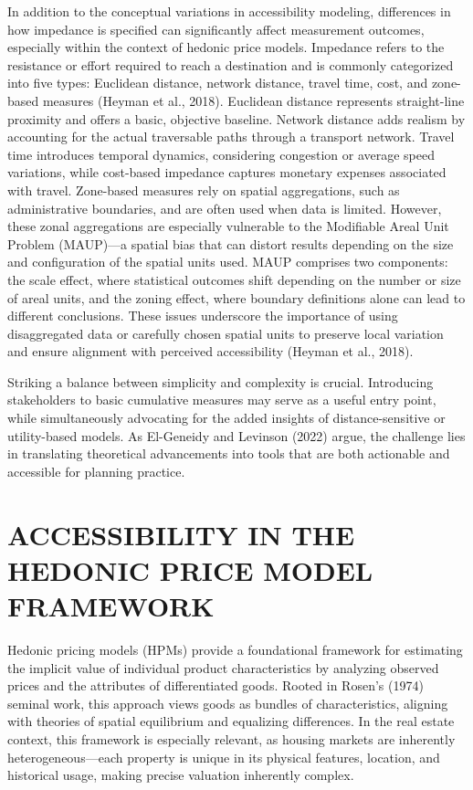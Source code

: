 \documentclass[
  12pt,
]{report}
\begin{document}
In addition to the conceptual variations in accessibility modeling,
differences in how impedance is specified can significantly affect
measurement outcomes, especially within the context of hedonic price
models. Impedance refers to the resistance or effort required to reach a
destination and is commonly categorized into five types: Euclidean
distance, network distance, travel time, cost, and zone-based measures
(Heyman et al., 2018). Euclidean distance represents straight-line
proximity and offers a basic, objective baseline. Network distance adds
realism by accounting for the actual traversable paths through a
transport network. Travel time introduces temporal dynamics, considering
congestion or average speed variations, while cost-based impedance
captures monetary expenses associated with travel. Zone-based measures
rely on spatial aggregations, such as administrative boundaries, and are
often used when data is limited. However, these zonal aggregations are
especially vulnerable to the Modifiable Areal Unit Problem (MAUP)---a
spatial bias that can distort results depending on the size and
configuration of the spatial units used. MAUP comprises two components:
the scale effect, where statistical outcomes shift depending on the
number or size of areal units, and the zoning effect, where boundary
definitions alone can lead to different conclusions. These issues
underscore the importance of using disaggregated data or carefully
chosen spatial units to preserve local variation and ensure alignment
with perceived accessibility (Heyman et al., 2018).

Striking a balance between simplicity and complexity is crucial.
Introducing stakeholders to basic cumulative measures may serve as a
useful entry point, while simultaneously advocating for the added
insights of distance-sensitive or utility-based models. As El-Geneidy
and Levinson (2022) argue, the challenge lies in translating theoretical
advancements into tools that are both actionable and accessible for
planning practice.

\section{ACCESSIBILITY IN THE HEDONIC PRICE MODEL
FRAMEWORK}\label{accessibility-in-the-hedonic-price-model-framework}

Hedonic pricing models (HPMs) provide a foundational framework for
estimating the implicit value of individual product characteristics by
analyzing observed prices and the attributes of differentiated goods.
Rooted in Rosen's (1974) seminal work, this approach views goods as
bundles of characteristics, aligning with theories of spatial
equilibrium and equalizing differences. In the real estate context, this
framework is especially relevant, as housing markets are inherently
heterogeneous---each property is unique in its physical features,
location, and historical usage, making precise valuation inherently
complex.
\end{document}
